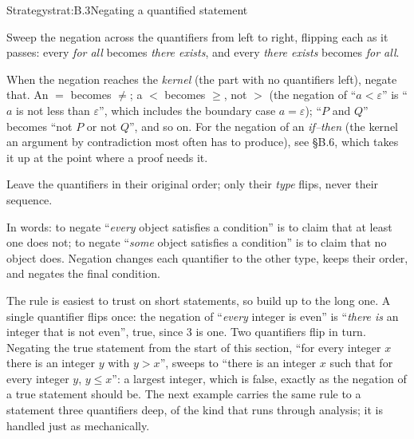 \documentclass[a4paper,12pt,oneside]{memoir}
\begin{document}
\begin{envstrategy}{Strategy}{strat:B.3}{Negating a quantified statement}
\begin{steps}
  \item Sweep the negation across the quantifiers from left to right, flipping each as it passes: every \emph{for all} becomes \emph{there exists}, and every \emph{there exists} becomes \emph{for all}.
  \item When the negation reaches the \emph{kernel} (the part with no quantifiers left), negate that. An \(=\) becomes \(\neq\); a \(<\) becomes \(\ge\), not \(>\) (the negation of “\(a < \varepsilon\)” is “\(a\) is not less than \(\varepsilon\)”, which includes the boundary case \(a = \varepsilon\)); “\(P\) and \(Q\)” becomes “not \(P\) or not \(Q\)”, and so on. For the negation of an \emph{if–then} (the kernel an argument by contradiction most often has to produce), see §B.6, which takes it up at the point where a proof needs it.
  \item Leave the quantifiers in their original order; only their \emph{type} flips, never their sequence.
\end{steps}
\begin{informal}
In words: to negate “\emph{every} object satisfies a condition” is to claim that at least one does not; to negate “\emph{some} object satisfies a condition” is to claim that no object does. Negation changes each quantifier to the other type, keeps their order, and negates the final condition.
\end{informal}
\end{envstrategy}
The rule is easiest to trust on short statements, so build up to the long one. A single quantifier flips once: the negation of “\emph{every} integer is even” is “\emph{there is} an integer that is not even”, true, since \(3\) is one. Two quantifiers flip in turn. Negating the true statement from the start of this section, “for every integer \(x\) there is an integer \(y\) with \(y > x\)”, sweeps to “there is an integer \(x\) such that for every integer \(y\), \(y \le x\)”: a largest integer, which is false, exactly as the negation of a true statement should be. The next example carries the same rule to a statement three quantifiers deep, of the kind that runs through analysis; it is handled just as mechanically.
\end{document}

